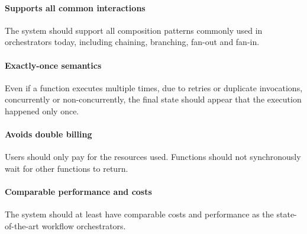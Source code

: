\paragraph{Supports all common interactions} The system should support all
composition patterns commonly used in orchestrators today, including chaining,
branching, fan-out and fan-in.

\paragraph{Exactly-once semantics} Even if a function executes multiple times,
due to retries or duplicate invocations, concurrently or non-concurrently, the
final state should appear that the execution happened only once.

\paragraph{Avoids double billing} Users should only pay for the resources
used. Functions should not synchronously wait for other functions to return.

\paragraph{Comparable performance and costs} The system should at least have
comparable costs and performance as the state-of-the-art workflow
orchestrators.
